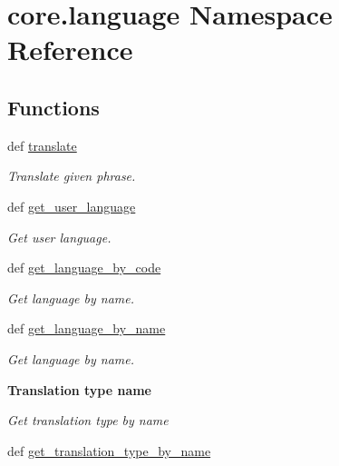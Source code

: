 \hypertarget{namespacecore_1_1language}{\section{core.\-language Namespace Reference}
\label{namespacecore_1_1language}
}
\subsection*{Functions}
\begin{DoxyCompactItemize}
\item 
def \hyperlink{namespacecore_1_1language_aea2e0702b0370d578660e0b7b506ae3b}{translate}
\begin{DoxyCompactList}\small\item\em Translate given phrase. \end{DoxyCompactList}\item 
def \hyperlink{namespacecore_1_1language_a03f83922fb3c78d7c0779ea3f6a01949}{get\-\_\-user\-\_\-language}
\begin{DoxyCompactList}\small\item\em Get user language. \end{DoxyCompactList}\item 
def \hyperlink{namespacecore_1_1language_ad983dfae376b307f04dfabc86c67437d}{get\-\_\-language\-\_\-by\-\_\-code}
\begin{DoxyCompactList}\small\item\em Get language by name. \end{DoxyCompactList}\item 
def \hyperlink{namespacecore_1_1language_abd539d13bd921cf37ba979cb369dfcc7}{get\-\_\-language\-\_\-by\-\_\-name}
\begin{DoxyCompactList}\small\item\em Get language by name. \end{DoxyCompactList}\end{DoxyCompactItemize}
\begin{Indent}{\bf Translation type name}\par
{\em Get translation type by name }\begin{DoxyCompactItemize}
\item 
def \hyperlink{namespacecore_1_1language_a5bd4bee1d1cfe7cff8f205e3c26563f9}{get\-\_\-translation\-\_\-type\-\_\-by\-\_\-name}
\end{DoxyCompactItemize}
\end{Indent}


